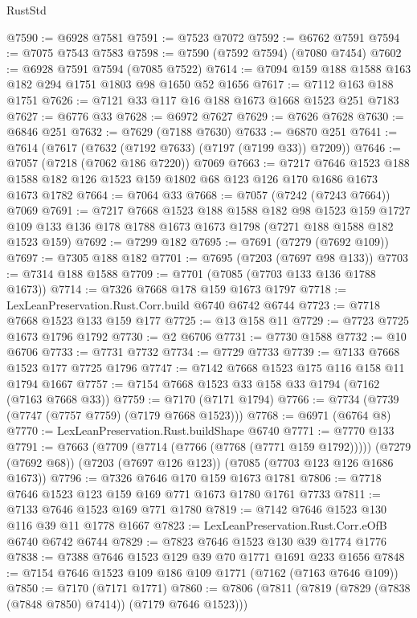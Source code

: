 \begin{lexlean}{RustStd}
\begin{coremodule}
{\begin{coremodule}
{{{{{{{{{{{{{{{{{{{{{{{{{{{{{{{{{{{{{{{{{{{{@7590 := @6928 @7581
@7591 := @7523 @7072
@7592 := @6762 @7591
@7594 := @7075 @7543 @7583
@7598 := @7590 (@7592 @7594) (@7080 @7454)
@7602 := @6928 @7591 @7594 (@7085 @7522)
@7614 := @7094 @159 @188 @1588 @163 @182 @294 @1751 @1803 @98 @1650 @52 @1656
@7617 := @7112 @163 @188 @1751
@7626 := @7121 @33 @117 @16 @188 @1673 @1668 @1523 @251 @7183
@7627 := @6776 @33
@7628 := @6972 @7627
@7629 := @7626 @7628
@7630 := @6846 @251
@7632 := @7629 (@7188 @7630)
@7633 := @6870 @251
@7641 := @7614 (@7617 (@7632 (@7192 @7633) (@7197 (@7199 @33)) @7209))
@7646 := @7057 (@7218 (@7062 @186 @7220)) @7069
@7663 := @7217
    @7646
    @1523
    @188
    @1588
    @182
    @126
    @1523
    @159
    @1802
    @68
    @123
    @126
    @170
    @1686
    @1673
    @1673
    @1782
@7664 := @7064 @33
@7668 := @7057 (@7242 (@7243 @7664)) @7069
@7691 := @7217
    @7668
    @1523
    @188
    @1588
    @182
    @98
    @1523
    @159
    @1727
    @109
    @133
    @136
    @178
    @1788
    @1673
    @1673
    @1798
    (@7271 @188 @1588 @182 @1523 @159)
@7692 := @7299 @182
@7695 := @7691 (@7279 (@7692 @109))
@7697 := @7305 @188 @182
@7701 := @7695 (@7203 (@7697 @98 @133))
@7703 := @7314 @188 @1588
@7709 := @7701 (@7085 (@7703 @133 @136 @1788 @1673))
@7714 := @7326 @7668 @178 @159 @1673 @1797
@7718 := LexLeanPreservation.Rust.Corr.build @6740 @6742 @6744
@7723 := @7718 @7668 @1523 @133 @159 @177
@7725 := @13 @158 @11
@7729 := @7723 @7725 @1673 @1796 @1792
@7730 := @2 @6706
@7731 := @7730 @1588
@7732 := @10 @6706
@7733 := @7731 @7732
@7734 := @7729 @7733
@7739 := @7133 @7668 @1523 @177 @7725 @1796
@7747 := @7142 @7668 @1523 @175 @116 @158 @11 @1794 @1667
@7757 := @7154 @7668 @1523 @33 @158 @33 @1794 (@7162 (@7163 @7668 @33))
@7759 := @7170 (@7171 @1794)
@7766 := @7734 (@7739 (@7747 (@7757 @7759) (@7179 @7668 @1523)))
@7768 := @6971 (@6764 @8)
@7770 := LexLeanPreservation.Rust.buildShape @6740
@7771 := @7770 @133
@7791 := @7663
    (@7709 (@7714 (@7766 (@7768 (@7771 @159 @1792)))))
    (@7279 (@7692 @68))
    (@7203 (@7697 @126 @123))
    (@7085 (@7703 @123 @126 @1686 @1673))
@7796 := @7326 @7646 @170 @159 @1673 @1781
@7806 := @7718 @7646 @1523 @123 @159 @169 @771 @1673 @1780 @1761 @7733
@7811 := @7133 @7646 @1523 @169 @771 @1780
@7819 := @7142 @7646 @1523 @130 @116 @39 @11 @1778 @1667
@7823 := LexLeanPreservation.Rust.Corr.eOfB @6740 @6742 @6744
@7829 := @7823 @7646 @1523 @130 @39 @1774 @1776
@7838 := @7388 @7646 @1523 @129 @39 @70 @1771 @1691 @233 @1656
@7848 := @7154 @7646 @1523 @109 @186 @109 @1771 (@7162 (@7163 @7646 @109))
@7850 := @7170 (@7171 @1771)
@7860 := @7806 (@7811 (@7819 (@7829 (@7838 (@7848 @7850) @7414)) (@7179 @7646 @1523)))
}}}}}}}}}}}}}}}}}}}}}}}}}}}}}}}}}}}}}}}}}}}}
\end{coremodule}}
\end{coremodule}
\end{lexlean}

